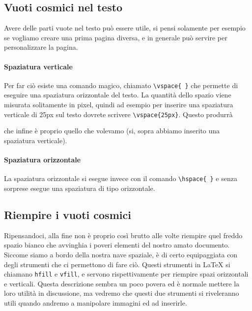\subsection{Vuoti cosmici nel testo}

Avere delle parti vuote nel testo può essere utile, si pensi solamente per
esempio se vogliamo creare una prima pagina diversa, e in generale può servire
per personalizzare la pagina.

\paragraph*{Spaziatura verticale} Per far ciò esiste una comando magico,
chiamato \verb!\vspace{ }! che permette di eseguire una spaziatura orizzontale
del testo. La quantità dello spazio viene misurata solitamente in pixel, quindi ad
esempio per inserire una spaziatura verticale di 25px sul testo dovrete
scrivere \verb!\vspace{25px}!. Questo produrrà

\vspace{25px}

\noindent che infine è proprio quello che volevamo (si, sopra abbiamo inserito
una spaziatura verticale).

\paragraph*{Spaziatura orizzontale} La spaziatura orizzontale si esegue invece
con il comando \verb!\hspace{ }! e senza sorprese esegue una spaziatura di tipo
orizzontale.

\subsection{Riempire i vuoti cosmici}

Ripensandoci, alla fine non è proprio così brutto alle volte riempire quel
freddo spazio bianco che avvinghia i poveri elementi del nostro amato
documento. Siccome siamo a bordo della nostra nave spaziale, è di certo
equipaggiata con degli strumenti che ci permettono di fare ciò. Questi
strumenti in \LaTeX{} si chiamano \texttt{hfill} e \texttt{vfill}, e servono
rispettivamente per riempire spazi orizzontali e verticali. Questa descrizione
sembra un poco povera ed è normale mettere la loro utilità in discussione, ma
vedremo che questi due strumenti si riveleranno utili quando andremo a
manipolare immagini ed ad inserirle.

